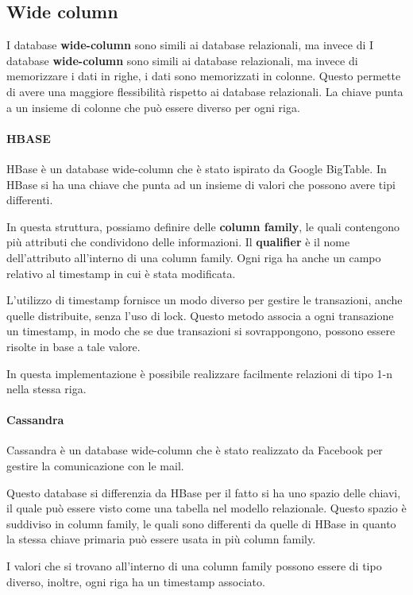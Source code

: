 \subsection{Wide column}
I database \textbf{wide-column} sono simili ai database relazionali, ma invece di
I database \textbf{wide-column} sono simili ai database relazionali, ma invece di
memorizzare i dati in righe, i dati sono memorizzati in colonne. Questo permette
di avere una maggiore flessibilità rispetto ai database relazionali. La chiave
punta a un insieme di colonne che può essere diverso per ogni riga.

\paragraph{HBASE}
HBase è un database wide-column che è stato ispirato da Google BigTable. In HBase
si ha una chiave che punta ad un insieme di valori che possono avere tipi differenti.

In questa struttura, possiamo definire delle \textbf{column family}, le quali
contengono più attributi che condividono delle informazioni. Il \textbf{qualifier} è
il nome dell'attributo all'interno di una column family. Ogni riga ha anche
un campo relativo al timestamp in cui è stata modificata.

L'utilizzo di timestamp fornisce un modo diverso per gestire le transazioni,
anche quelle distribuite, senza l'uso di lock. Questo metodo associa a ogni
transazione un timestamp, in modo che se due transazioni si sovrappongono,
possono essere risolte in base a tale valore.

In questa implementazione è possibile realizzare facilmente relazioni di tipo 1-n
nella stessa riga.
\paragraph{Cassandra}
Cassandra è un database wide-column che è stato realizzato da Facebook per gestire
la comunicazione con le mail.

Questo database si differenzia da HBase per il fatto si ha uno spazio delle chiavi,
il quale può essere visto come una tabella nel modello relazionale. Questo spazio
è suddiviso in column family, le quali sono differenti da quelle di HBase in quanto
la stessa chiave primaria può essere usata in più column family.

I valori che si trovano all'interno di una column family possono essere di tipo
diverso, inoltre, ogni riga ha un timestamp associato.

